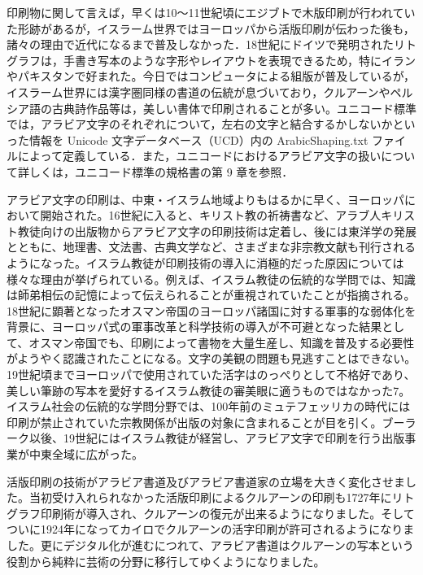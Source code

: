 印刷物に関して言えば，早くは10〜11世紀頃にエジブトで木版印刷が行われていた形跡があるが，イスラーム世界ではヨーロッパから活版印刷が伝わった後も，諸々の理由で近代になるまで普及しなかった．18世紀にドイツで発明されたリトグラフは，手書き写本のような字形やレイアウトを表現できるため，特にイランやパキスタンで好まれた。今日ではコンピュータによる組版が普及しているが，イスラーム世界には漢字圏同様の書道の伝統が息づいており，クルアーンやペルシア語の古典詩作品等は，美しい書体で印刷されることが多い。ユニコード標準では，アラビア文字のそれぞれについて，左右の文字と結合するかしないかといった情報を Unicode 文字データベース（UCD）内の ArabicShaping.txt ファイルによって定義している．また，ユニコードにおけるアラビア文字の扱いについて詳しくは，ユニコード標準の規格書の第 9 章を参照\cite{islamic_area_studies_resources}．

アラビア文字の印刷は、中東・イスラム地域よりもはるかに早く、ヨーロッパにおいて開始された。16世紀に入ると、キリスト教の祈祷書など、アラブ人キリスト教徒向けの出版物からアラビア文字の印刷技術は定着し、後には東洋学の発展とともに、地理書、文法書、古典文学など、さまざまな非宗教文献も刊行されるようになった。イスラム教徒が印刷技術の導入に消極的だった原因については様々な理由が挙げられている。例えば、イスラム教徒の伝統的な学問では、知識は師弟相伝の記憶によって伝えられることが重視されていたことが指摘される。18世紀に顕著となったオスマン帝国のヨーロッパ諸国に対する軍事的な弱体化を背景に、ヨーロッパ式の軍事改革と科学技術の導入が不可避となった結果として、オスマン帝国でも、印刷によって書物を大量生産し、知識を普及する必要性がようやく認識されたことになる。文字の美観の問題も見逃すことはできない。19世紀頃までヨーロッパで使用されていた活字はのっぺりとして不格好であり、美しい筆跡の写本を愛好するイスラム教徒の審美眼に適うものではなかった7。イスラム社会の伝統的な学問分野では、100年前のミュテフェッリカの時代には印刷が禁止されていた宗教関係が出版の対象に含まれることが目を引く。ブーラーク以後、19世紀にはイスラム教徒が経営し、アラビア文字で印刷を行う出版事業が中東全域に広がった\cite{rnavi.ndl.go.jp:asia/entry/bulletin7-3-2.php}。

活版印刷の技術がアラビア書道及びアラビア書道家の立場を大きく変化させました。当初受け入れられなかった活版印刷によるクルアーンの印刷も1727年にリトグラフ印刷術が導入され、クルアーンの復元が出来るようになりました。そしてついに1924年になってカイロでクルアーンの活字印刷が許可されるようになりました。更にデジタル化が進むにつれて、アラビア書道はクルアーンの写本という役割から純粋に芸術の分野に移行してゆくようになりました\cite{www.jaca2006.org/アラビア書道とその歴史/}。

